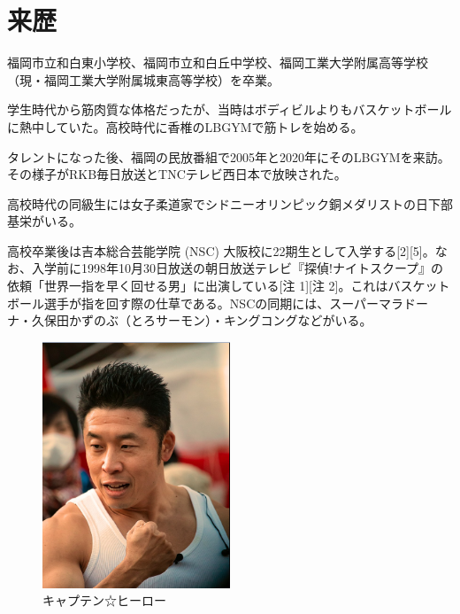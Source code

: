 \section{来歴}
福岡市立和白東小学校、福岡市立和白丘中学校、福岡工業大学附属高等学校（現・福岡工業大学附属城東高等学校）を卒業\cite{wiki}。

学生時代から筋肉質な体格だったが、当時はボディビルよりもバスケットボールに熱中していた。高校時代に香椎のLBGYMで筋トレを始める。

タレントになった後、福岡の民放番組で2005年と2020年にそのLBGYMを来訪。その様子がRKB毎日放送とTNCテレビ西日本で放映された。

高校時代の同級生には女子柔道家でシドニーオリンピック銅メダリストの日下部基栄がいる。

高校卒業後は吉本総合芸能学院 (NSC) 大阪校に22期生として入学する[2][5]。なお、入学前に1998年10月30日放送の朝日放送テレビ『探偵!ナイトスクープ』の依頼「世界一指を早く回せる男」に出演している[注 1][注 2]。これはバスケットボール選手が指を回す際の仕草である。NSCの同期には、スーパーマラドーナ・久保田かずのぶ（とろサーモン）・キングコングなどがいる。

\begin{figure}[htbp]
  \centering
  \includegraphics[width=0.5\textwidth]{Chapter1/figures/image.png}
  \caption{キャプテン☆ヒーロー}
  \label{fig:my_label}
\end{figure}
